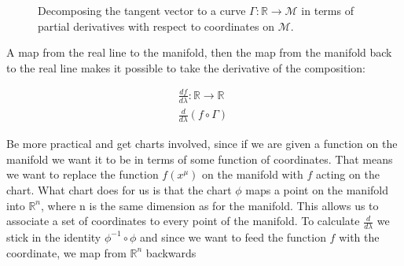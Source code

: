 \documentclass[11pt]{article}
\begin{document}
\begin{figure} [H]
\begin{center}

        \caption{ Decomposing the tangent vector to a curve $\Gamma :\mathbb{R} \rightarrow \mathcal{M}$ in terms of partial derivatives with respect to coordinates on  $\mathcal{M}$. }
            \end{center}
    \end{figure}
    
\pagebreak
    
A map from the real line to the manifold, then the map from the manifold back to the real line makes it possible to take the derivative of the composition:

\begin{align*}
\frac{df}{d\lambda}: \mathbb{R} \rightarrow \mathbb{R} \ \\
\frac{d}{d\lambda}(f \circ \Gamma) \ 
\end{align*}

Be more practical and get charts involved, since if we are given a function on the manifold we want it to be in terms of some function of coordinates. That means we want to replace the function $f(x^\mu)$ on the manifold with $f$ acting on the chart. What chart does for us is that the chart $\phi$  maps a point on the manifold into $\mathbb{R}^n$, where n is the same dimension as for the manifold. This allows us to associate a set of coordinates to every point of the manifold. To calculate $\frac{d}{d\lambda}$ we stick in the identity $\phi^{-1}\circ\phi$ and since we want to feed the function $f$ with the coordinate, we map from $\mathbb{R}^n$ backwards
\end{document}
